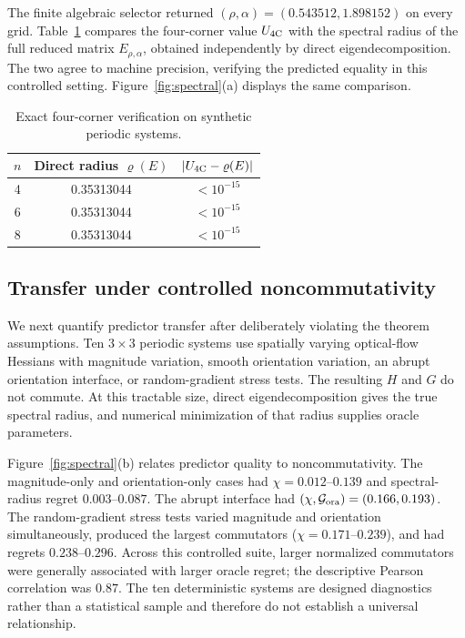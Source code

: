 \documentclass[11pt]{article}
\theoremstyle{definition}
\newcommand{\spr}{\varrho}
\begin{document}
The finite algebraic selector returned
$(\rho,\alpha)=(0.543512,1.898152)$ on every grid. Table~\ref{tab:constant}
compares the four-corner value $U_{\rm 4C}$ with the spectral radius of the
full reduced matrix $E_{\rho,\alpha}$, obtained independently by direct
eigendecomposition. The two agree to machine precision, verifying the
predicted equality in this controlled setting. Figure~\ref{fig:spectral}(a)
displays the same comparison.

\begin{table}[H]
\centering
\caption{Exact four-corner verification on synthetic periodic systems.}
\label{tab:constant}
\begin{tabular}{ccc}
\toprule
$n$ & Direct radius $\spr(E)$ & $|U_{\rm 4C}-\spr(E)|$\\
\midrule
4 & 0.35313044 & $<10^{-15}$\\
6 & 0.35313044 & $<10^{-15}$\\
8 & 0.35313044 & $<10^{-15}$\\
\bottomrule
\end{tabular}
\end{table}

\subsection{Transfer under controlled noncommutativity}
We next quantify predictor transfer after deliberately violating the theorem
assumptions. Ten $3\times3$ periodic systems use spatially varying optical-flow
Hessians with magnitude variation, smooth orientation variation, an abrupt
orientation interface, or random-gradient stress tests. The resulting $H$ and
$G$ do not commute. At this tractable size, direct eigendecomposition gives
the true spectral radius, and numerical minimization of that radius supplies
oracle parameters.

Figure~\ref{fig:spectral}(b) relates predictor quality to noncommutativity.
The magnitude-only and orientation-only cases had $\chi=0.012$--$0.139$ and
spectral-radius regret $0.003$--$0.087$. The abrupt interface had
$(\chi,\mathcal G_{\rm ora})=(0.166,0.193)$. The random-gradient stress tests
varied magnitude and orientation simultaneously, produced the largest
commutators ($\chi=0.171$--$0.239$), and had regrets $0.238$--$0.296$. Across
this controlled suite, larger normalized commutators were generally associated
with larger oracle regret; the descriptive Pearson correlation was $0.87$.
The ten deterministic systems are designed diagnostics rather than a
statistical sample and therefore do not establish a universal relationship.
\end{document}
